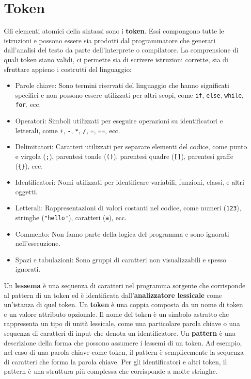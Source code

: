 \documentclass[
  letterpaper,
]{scrbook}
\begin{document}
\section{Token}\label{token}

Gli elementi atomici della sintassi sono i \textbf{token}. Essi
compongono tutte le istruzioni e possono essere sia prodotti dal
programmatore che generati dall'analisi del testo da parte
dell'interprete o compilatore. La comprensione di quali token siano
validi, ci permette sia di scrivere istruzioni corrette, sia di
sfruttare appieno i costrutti del linguaggio:

\begin{itemize}
\item
  Parole chiave: Sono termini riservati del linguaggio che hanno
  significati specifici e non possono essere utilizzati per altri scopi,
  come \texttt{if}, \texttt{else}, \texttt{while}, \texttt{for}, ecc.
\item
  Operatori: Simboli utilizzati per eseguire operazioni su
  identificatori e letterali, come \texttt{+}, \texttt{-}, \texttt{*},
  \texttt{/}, \texttt{=}, \texttt{==}, ecc.
\item
  Delimitatori: Caratteri utilizzati per separare elementi del codice,
  come punto e virgola (\texttt{;}), parentesi tonde (\texttt{()}),
  parentesi quadre (\texttt{{[}{]}}), parentesi graffe (\texttt{\{\}}),
  ecc.
\item
  Identificatori: Nomi utilizzati per identificare variabili, funzioni,
  classi, e altri oggetti.
\item
  Letterali: Rappresentazioni di valori costanti nel codice, come numeri
  (\texttt{123}), stringhe (\texttt{"hello"}), caratteri
  (\texttt{\textquotesingle{}a\textquotesingle{}}), ecc.
\item
  Commento: Non fanno parte della logica del programma e sono ignorati
  nell'esecuzione.
\item
  Spazi e tabulazioni: Sono gruppi di caratteri non visualizzabili e
  spesso ignorati.
\end{itemize}

Un \textbf{lessema} è una sequenza di caratteri nel programma sorgente
che corrisponde al pattern di un token ed è identificata
dall'\textbf{analizzatore lessicale} come un'istanza di quel token. Un
\textbf{token} è una coppia composta da un nome di token e un valore
attributo opzionale. Il nome del token è un simbolo astratto che
rappresenta un tipo di unità lessicale, come una particolare parola
chiave o una sequenza di caratteri di input che denota un
identificatore. Un \textbf{pattern} è una descrizione della forma che
possono assumere i lessemi di un token. Ad esempio, nel caso di una
parola chiave come token, il pattern è semplicemente la sequenza di
caratteri che forma la parola chiave. Per gli identificatori e altri
token, il pattern è una struttura più complessa che corrisponde a molte
stringhe.
\end{document}
